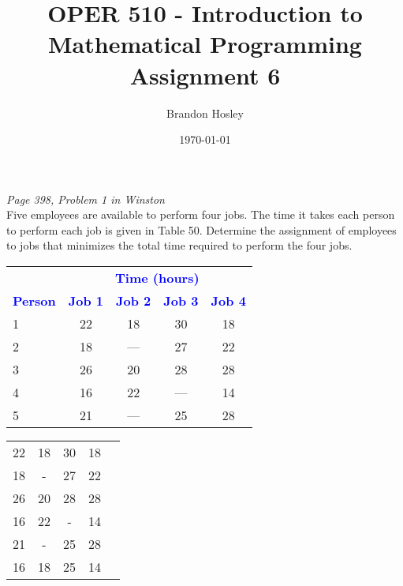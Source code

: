 \documentclass[answers]{exam}
\title{OPER 510 - Introduction to Mathematical Programming%
	\\ Assignment 6}
\author{Brandon Hosley}
\date{\today}
\begin{document}
\maketitle
\unframedsolutions

\begin{questions}
\question \textit{Page 398, Problem 1 in Winston} \\
Five employees are available to perform four jobs. The time it takes each person to perform each job is given in Table 50. Determine the assignment of employees to jobs that minimizes the total time required to perform the four jobs.
\begin{center}
	\setlength{\aboverulesep}{0pt}
	\setlength{\belowrulesep}{0pt}
	\setlength{\extrarowheight}{.75ex}
	\begin{tabular}{lcccc}
		\toprule
		\rowcolor{gray!25}
		& \multicolumn{4}{c}{  \textbf{\textcolor{Blue}{Time (hours)}}  }  \\ 
		\cline{2-5} \rowcolor{gray!25}
		\textbf{\textcolor{Blue}{Person}} & \textbf{\textcolor{Blue}{Job 1}} & \textbf{\textcolor{Blue}{Job 2}} & \textbf{\textcolor{Blue}{Job 3}} & \textbf{\textcolor{Blue}{Job 4}}  \\
		\midrule
		1 & 22 & 18 & 30 & 18 \\
		2 & 18 & —  & 27 & 22 \\
		3 & 26 & 20 & 28 & 28 \\
		4 & 16 & 22 &  — & 14 \\
		5 & 21 & —  & 25 & 28 \\
		\bottomrule[2pt]
	\end{tabular}
\end{center}

\begin{solution}
	
	
	\begin{tabular}{ccccc}
		22                        & 18                        & 30                        & 18                        & {\color[HTML]{C0C0C0} } \\
		18                        & -                         & 27                        & 22                        & {\color[HTML]{C0C0C0} } \\
		26                        & 20                        & 28                        & 28                        & {\color[HTML]{C0C0C0} } \\
		16                        & 22                        & -                         & 14                        & {\color[HTML]{C0C0C0} } \\
		21                        & -                         & 25                        & 28                        & {\color[HTML]{C0C0C0} } \\
		{\color[HTML]{C0C0C0} 16} & {\color[HTML]{C0C0C0} 18} & {\color[HTML]{C0C0C0} 25} & {\color[HTML]{C0C0C0} 14} & {\color[HTML]{C0C0C0} }
	\end{tabular} \\


\end{solution}
\end{questions}
\end{document}
